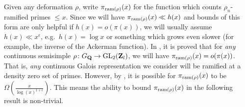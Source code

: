Given any deformation $\rho$, write $\pi_{\mathrm{ram}(\rho)}(x)$ for the function 
which counts $\rho_n$-ramified primes $\leqslant x$. Since we will have 
$\pi_{\mathrm{ram}(\rho)}(x)\ll h(x)$ and bounds of this form are only helpful 
if $h(x) = o(\pi(x))$, we will usually assume $h(x) \ll x^\epsilon$, 
e.g.~$h(x) = \log x$ or something which grows even slower (for example, the 
inverse of the Ackerman function). In \cite{khare-rajan-2001}, it is proved 
that for \emph{any} continuous semisimple $\rho\colon G_{\mathbf{Q}} \to \operatorname{GL}_2(\mathbf{Z}_l)$, 
we will have $\pi_{\mathrm{ram}(\rho)}(x) = o(\pi(x))$. That is, \emph{any} continuous 
Galois representation we consider will be ramified at a density zero set of 
primes. However, by \cite[Th.~19]{khare-larsen-ramakrishna-2005}, it is 
possible for $\pi_{\mathrm{ram}(\rho)}(x)$ to be 
$\Omega(\frac{x}{\log(x)^{1+\epsilon}})$. This means the ability to bound 
$\pi_{\mathrm{ram}(\rho)}(x)$ in the following result is non-trivial. 

